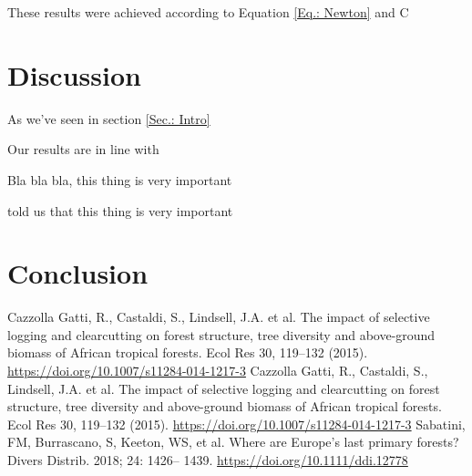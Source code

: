 \documentclass[a4paper, 12pt]{article} %
\begin{document}
These results were achieved according to Equation \ref{Eq.: Newton} and C


\section{Discussion}


As we've seen in section \ref{Sec.: Intro}

\noindent Our results are in line with \citep{Alternative_C._Gatti_2015}  %

\noindent Bla bla bla, this thing is very important \citep{Alternative_C._Gatti_2015} %

\noindent \citet{Alternative_C._Gatti_2015} told us that this thing is very important %

\noindent \citet{Alternative_C._Gatti_2015, Sabatini_2018} %


\section{Conclusion}


\begin{thebibliography}{999} %
Cazzolla Gatti, R., Castaldi, S., Lindsell, J.A. et al. The impact of selective logging and clearcutting on forest structure, tree diversity and above-ground biomass of African tropical forests. Ecol Res 30, 119–132 (2015). \url{https://doi.org/10.1007/s11284-014-1217-3} %
Cazzolla Gatti, R., Castaldi, S., Lindsell, J.A. et al. The impact of selective logging and clearcutting on forest structure, tree diversity and above-ground biomass of African tropical forests. Ecol Res 30, 119–132 (2015). \url{https://doi.org/10.1007/s11284-014-1217-3}
Sabatini, FM, Burrascano, S, Keeton, WS, et al. Where are Europe’s last primary forests? Divers Distrib. 2018; 24: 1426– 1439. \url{https://doi.org/10.1111/ddi.12778}
\end{thebibliography}
\end{document}

